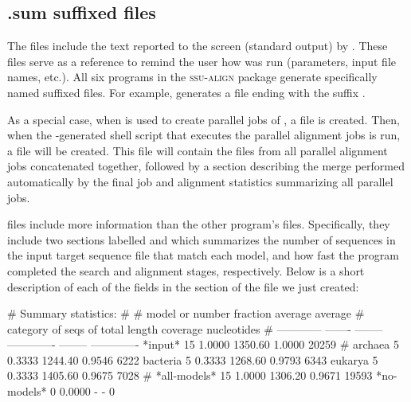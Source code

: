 \subsection{.sum suffixed files}

The  files include the text reported to the screen
(standard output) by . These files serve as a
reference to remind the user how  was run
(parameters, input file names, etc.). All six programs in the
\textsc{ssu-align} package generate specifically named 
suffixed files. For example,  generates a file ending
with the suffix .

As a special case, when  is used to create parallel
jobs of , a  file is created. Then,
when the -generated shell script that executes the
parallel alignment jobs is run, a  file will be created.
This  file will contain the 
 files from all parallel alignment jobs
concatenated together, followed by a section describing the merge
performed automatically by the final job and alignment
statistics summarizing all parallel jobs.

 files include more information than the other
program's  files. Specifically, they include two sections
labelled  and  which
summarizes the number of sequences in the input target sequence file
that match each model, and how fast the program completed the search
and alignment stages, respectively. Below is a short description of
each of the fields in the  section of the
 file we just created:

\begin{sreoutput}
# Summary statistics:
#
# model or       number  fraction        average   average               
# category      of seqs  of total         length  coverage    nucleotides
# ------------  -------  --------  -------------  --------  -------------
  *input*            15    1.0000        1350.60    1.0000          20259
#
  archaea             5    0.3333        1244.40    0.9546           6222
  bacteria            5    0.3333        1268.60    0.9793           6343
  eukarya             5    0.3333        1405.60    0.9675           7028
#
  *all-models*       15    1.0000        1306.20    0.9671          19593
  *no-models*         0    0.0000              -         -              0
\end{sreoutput}

